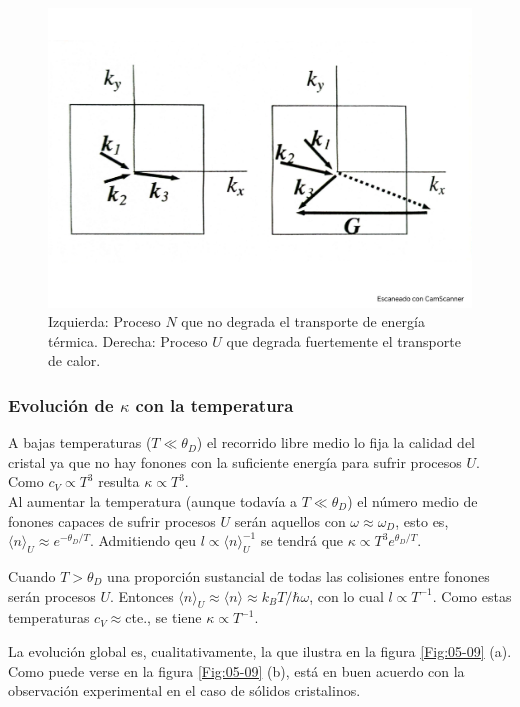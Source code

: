 \begin{figure}[h!] \centering
    \includegraphics[scale=0.35]{Cuerpo/Ch_05/Fotos libro 8.pdf}
    \caption{Izquierda: Proceso $N$ que no degrada el transporte de energía térmica. Derecha: Proceso $U$ que degrada fuertemente el transporte de calor.}
    \label{Fig:05-08}
\end{figure}    

\subsubsection{Evolución de $\kappa$ con la temperatura}

A bajas temperaturas ($T\ll \theta_D$) el recorrido libre medio lo fija la calidad del cristal ya que no hay fonones con la suficiente energía para sufrir procesos $U$. Como $c_V \propto T^3$ resulta $\kappa \propto T^3$. \\

Al aumentar la temperatura (aunque todavía a $T\ll \theta_D$) el número medio de fonones capaces de sufrir procesos $U$ serán aquellos con $\omega\approx\omega_D$, esto es, $\langle n\rangle_U \approx e^{-\theta_D / T}$. Admitiendo qeu $l\propto \langle n \rangle_U^{-1}$ se tendrá que $\kappa \propto T^3 e^{\theta_D/T}$. 

Cuando $T>\theta_D$ una proporción sustancial de todas las colisiones entre fonones serán procesos $U$. Entonces $\langle n \rangle_U \approx \langle n \rangle \approx k_B T / \hbar \omega$, con lo cual $l \propto T^{-1}$. Como estas temperaturas $c_V\approx$cte., se tiene $\kappa \propto T^{-1}$.

La evolución global es, cualitativamente, la que ilustra en la figura \ref{Fig:05-09} (a). Como puede verse en la figura \ref{Fig:05-09} (b), está en buen acuerdo con la observación experimental en el caso de sólidos cristalinos.

